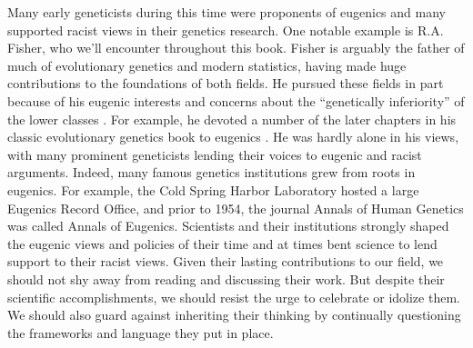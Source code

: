 Many early geneticists during this time were proponents of eugenics and many supported racist views in their genetics research. One notable example is R.A. Fisher, who we'll encounter throughout this book. Fisher is arguably the father of much of evolutionary genetics and modern statistics, having made huge contributions to the foundations of both fields. He pursued these fields in part because of his eugenic interests and concerns about the ``genetically inferiority” of the lower classes \citep{norton1983fisher,mazumdar2005eugenics_fisher}. For example, he devoted a number of the later chapters in his classic evolutionary genetics book to eugenics \citep{fisher1930}. He was hardly alone in his views, with many prominent geneticists lending their voices to eugenic and racist arguments. Indeed, many famous genetics institutions grew from roots in eugenics. For example, the Cold Spring Harbor Laboratory hosted a large Eugenics Record Office, and prior to 1954, the journal Annals of Human Genetics was called Annals of Eugenics. Scientists and their institutions strongly shaped the eugenic views and policies of their time and at times bent science to lend support to their racist views. Given their lasting contributions to our field, we should not shy away from reading and discussing their work. But despite their scientific accomplishments, we should resist the urge to celebrate or idolize them. We should also guard against inheriting their thinking by continually questioning the frameworks and language they put in place.


